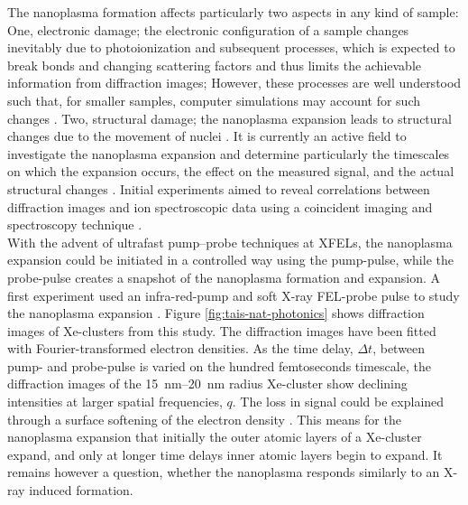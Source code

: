 The nanoplasma formation affects particularly two aspects in any kind of sample: One, electronic damage; the electronic configuration of a sample changes inevitably due to photoionization and subsequent processes, which is expected to break bonds and changing scattering factors and thus limits the achievable information from diffraction images; However, these processes are well understood such that, for smaller samples, computer simulations may account for such changes \citep{Aquila-2015-StrucDyn,Quiney-2010-NatPhys}. Two, structural damage; the nanoplasma expansion leads to structural changes due to the movement of nuclei \citep{Neutze-2000-Nature}. It is currently an active field to investigate the nanoplasma expansion and determine particularly the timescales on which the expansion occurs, the effect on the measured signal, and the actual structural changes \citep{Bostedt-2012-PRL}. Initial experiments aimed to reveal correlations between diffraction images and ion spectroscopic data using a coincident imaging and spectroscopy technique \citep{Gorkhover-2012-PRL,Rupp-2016-PRL}.\\[1\baselineskip]
%
With the advent of ultrafast pump--probe techniques at XFELs, the nanoplasma expansion could be initiated in a controlled way using the pump-pulse, while the probe-pulse creates a snapshot of the nanoplasma formation and expansion. A first experiment used an infra-red-pump and soft X-ray FEL-probe pulse \citep{Schorb-2012-APL} to study the nanoplasma expansion \citep{Gorkhover-2016-NatPho}. Figure \ref{fig:tais-nat-photonics} shows diffraction images of Xe-clusters from this study. The diffraction images have been fitted with Fourier-transformed electron densities. As the time delay, $\Delta t$, between pump- and probe-pulse is varied on the hundred femtoseconds timescale, the diffraction images of the \SIrange{15}{20}{\nano\meter} radius Xe-cluster show declining intensities at larger spatial frequencies, $q$. The loss in signal could be explained through a surface softening of the electron density \citep{Hau-Riege-2008-PRE,Peltz-2014-PRL}. This means for the nanoplasma expansion that initially the outer atomic layers of a Xe-cluster expand, and only at longer time delays inner atomic layers begin to expand. It remains however a question, whether the nanoplasma responds similarly to an X-ray induced formation.\\[1\baselineskip]
